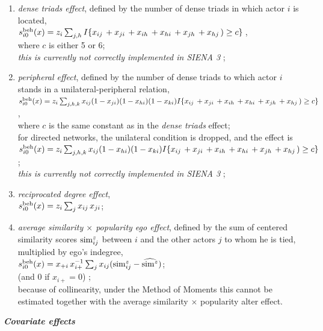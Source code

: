 \documentclass[a4paper,fleqn]{article}
\newcommand{\+}{\, + \,}
\newcommand{\vit}{\theenumi}
\newcommand{\SI}{{\sf SIENA }}
\newcounter{savenumi}
\begin{document}
{\begin{enumerate}
 \item {\em dense triads effect}, defined by the number of dense triads in which actor $i$ is
 located, \\
 $s^{\rm beh}_{i\vit}(x) =  z_i \sum_{j,h} I\{ x_{ij}\, + x_{ji}\, + x_{ih}\, + x_{hi}\,
 + x_{jh}\, + x_{hj}\,)\geq c \}\,$,\\
 where $c$ is either 5 or 6; \\
 \emph{this is currently not correctly implemented in \SI 3 };

 \item {\em peripheral effect}, defined by the number of dense triads to which actor $i$ stands
 in a unilateral-peripheral relation,\\
 $s^{\rm beh}_{i\vit}(x) =  z_i \sum_{j,h,k} x_{ij} (1-x_{ji})(1-x_{hi})(1-x_{ki})
 I\{ x_{ij}\,  + x_{ji}\, + x_{ih}\, + x_{hi}\, + x_{jh}\, + x_{hj}\,)\geq c \} \,$,\\
 where $c$ is the same constant as in the {\it dense triads} effect;\\
 for directed networks, the unilateral condition is dropped, and the effect is\\
 $s^{\rm beh}_{i\vit}(x) =  z_i \sum_{j,h,k} x_{ij} (1-x_{hi})(1-x_{ki})
 I\{ x_{ij}\,  + x_{ji}\, + x_{ih}\, + x_{hi}\, + x_{jh}\, + x_{hj}\,)\geq c \} \,$;\\
 \emph{this is currently not correctly implemented in \SI 3 };

 \item {\em reciprocated degree effect}, \\
 $s^{\rm beh}_{i\vit}(x) = z_i \sum_j x_{ij}\,x_{ji} $;

 \item {\em average similarity $\times$ popularity ego effect}, defined by the
 sum of centered similarity scores ${\rm sim}^z_{ij}$ between $i$
 and the other actors $j$ to whom he is  tied, multiplied by ego's indegree, \\
 $s^{\rm beh}_{i\vit}(x) =  x_{+i} \, x_{i+}^{-1} \sum_j x_{ij} ({\rm sim}^z_{ij} - \widehat{{\rm sim}^z}) $;\\
 (and 0 if $x_{i+} = 0$) ;\\
 because of collinearity, under the Method of Moments this cannot be estimated together with the
  average similarity $\times$ popularity alter effect.

\setcounter{savenumi}{\value{enumi}}
\end{enumerate}
\medskip

\noindent
\textbf{\emph{Covariate effects}}
\medskip

}
\end{document}
